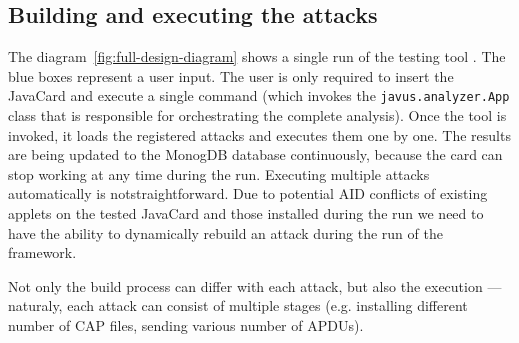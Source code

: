 \documentclass{../llncs/llncs}
\begin{document}
        



    \subsection{Building and executing the attacks}\label{sec:build-execute-attacks}

    The diagram~\ref{fig:full-design-diagram} shows a single run of the testing tool \javus. The blue boxes represent a user input. The user is only required to insert the JavaCard and execute a single command \javusrun (which invokes the \texttt{javus.analyzer.App} class that is responsible for orchestrating the complete analysis). Once the tool is invoked, it loads the registered attacks and executes them one by one. The results are being updated to the MonogDB database continuously, because the card can stop working at any time during the run.
    Executing multiple attacks automatically is not\linebreak straightforward.
    Due to potential AID conflicts of existing applets on the tested JavaCard and those installed during the run we need to have the ability to dynamically rebuild an attack during the run of the framework.

    Not only the build process can differ with each attack, but also the execution --- naturaly, each attack can consist of multiple stages (e.g. installing different number of CAP files, sending various number of APDUs).
\end{document}
